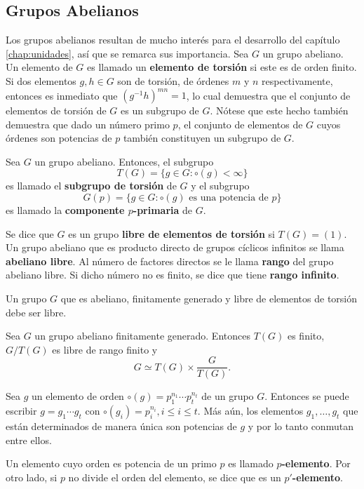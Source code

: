 \subsection{Grupos Abelianos}
Los grupos abelianos resultan de mucho interés para el desarrollo del capítulo \ref{chap:unidades}, así que se remarca sus importancia.
Sea $G$ un grupo abeliano. Un elemento de $G$ es llamado un \textbf{elemento de torsión} si este es de orden finito. Si dos elementos $g,h \in G$ son de torsión, de órdenes $m$ y $n$ respectivamente, entonces es inmediato que $(g^{-1}h)^{mn} = 1$, lo cual demuestra que el conjunto de elementos de torsión de $G$ es un subgrupo de $G$. Nótese que este hecho también demuestra que dado un número primo $p$, el conjunto de elementos de $G$ cuyos órdenes son potencias de $p$ también constituyen un subgrupo de $G$.
\begin{definicion}
Sea $G$ un grupo abeliano. Entonces, el subgrupo 
\[T(G) = \{ g \in G \colon \circ(g) < \infty \}  \]
es llamado el \textbf{subgrupo de torsión} de $G$ y el subgrupo \[ G(p) = \{g \in G \colon \circ(g) \mbox{ es una potencia de } p  \} \] es llamado la \textbf{componente $p$-primaria} de $G$.
\end{definicion}
Se dice que $G$ es un grupo \textbf{libre de elementos de torsión} si $T(G) = (1)$.
Un grupo abeliano que es producto directo de grupos cíclicos infinitos se llama \textbf{abeliano libre}. Al número de factores directos se le llama \textbf{rango} del grupo abeliano libre. Si dicho número no es finito, se dice que tiene \textbf{rango infinito}.
\begin{teorema}
Un grupo $G$ que es abeliano, finitamente generado y libre de elementos de torsión debe ser libre.
\end{teorema}
\begin{teorema}
Sea $G$ un grupo abeliano finitamente generado. Entonces $T(G)$ es finito, $G/T(G)$ es libre de rango finito y \[ G \simeq T(G)\times \frac{G}{T(G)}. \]
\end{teorema}
\begin{lema}
Sea $g$ un elemento de orden $\circ(g) = p_1^{n_1}\cdots p_t^{n_t}$ de un grupo $G$. Entonces se puede escribir $g = g_1\cdots g_t$ con $\circ(g_i) = p_i^{n_i}, i\leq i \leq t$. Más aún, los elementos $g_1, \dots, g_t$ que están determinados de manera única son potencias de $g$ y por lo tanto conmutan entre ellos. 
\end{lema}
Un elemento cuyo orden es potencia de un primo $p$ es llamado  \textbf{$p$-elemento}. Por otro lado, si $p$ no divide el orden del elemento, se dice que es un \textbf{$p'$-elemento}.

